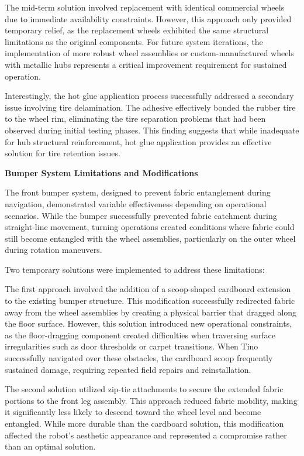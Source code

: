 The mid-term solution involved replacement with identical commercial wheels due to immediate availability constraints. However, this approach only provided temporary relief, as the replacement wheels exhibited the same structural limitations as the original components. For future system iterations, the implementation of more robust wheel assemblies or custom-manufactured wheels with metallic hubs represents a critical improvement requirement for sustained operation.

Interestingly, the hot glue application process successfully addressed a secondary issue involving tire delamination. The adhesive effectively bonded the rubber tire to the wheel rim, eliminating the tire separation problems that had been observed during initial testing phases. This finding suggests that while inadequate for hub structural reinforcement, hot glue application provides an effective solution for tire retention issues.

\textbf{Bumper System Limitations and Modifications}

The front bumper system, designed to prevent fabric entanglement during navigation, demonstrated variable effectiveness depending on operational scenarios. While the bumper successfully prevented fabric catchment during straight-line movement, turning operations created conditions where fabric could still become entangled with the wheel assemblies, particularly on the outer wheel during rotation maneuvers.

Two temporary solutions were implemented to address these limitations:

The first approach involved the addition of a scoop-shaped cardboard extension to the existing bumper structure. This modification successfully redirected fabric away from the wheel assemblies by creating a physical barrier that dragged along the floor surface. However, this solution introduced new operational constraints, as the floor-dragging component created difficulties when traversing surface irregularities such as door thresholds or carpet transitions. When Tino successfully navigated over these obstacles, the cardboard scoop frequently sustained damage, requiring repeated field repairs and reinstallation.

The second solution utilized zip-tie attachments to secure the extended fabric portions to the front leg assembly. This approach reduced fabric mobility, making it significantly less likely to descend toward the wheel level and become entangled. While more durable than the cardboard solution, this modification affected the robot's aesthetic appearance and represented a compromise rather than an optimal solution.

